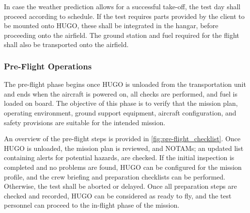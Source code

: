 In case the weather prediction allows for a successful take-off, the test day shall proceed according to schedule. If the test requires parts provided by the client to be mounted onto HUGO, these shall be integrated in the hangar, before proceeding onto the airfield. The ground station and fuel required for the flight shall also be transported onto the airfield.

\subsubsection{Pre-Flight Operations}
The pre-flight phase begins once HUGO is unloaded from the transportation unit and ends when the aircraft is powered on, all checks are performed, and fuel is loaded on board. The objective of this phase is to verify that the mission plan, operating environment, ground support equipment, aircraft configuration, and safety provisions are suitable for the intended mission.

An overview of the pre-flight steps is provided in \autoref{fig:pre-flight_checklist}. Once HUGO is unloaded, the mission plan is reviewed, and NOTAMs; an updated list containing alerts for potential hazards, are checked. If the initial inspection is completed and no problems are found, HUGO can be configured for the mission profile, and the crew briefing and preparation checklists can be performed. Otherwise, the test shall be aborted or delayed. Once all preparation steps are checked and recorded, HUGO can be considered as ready to fly, and the test personnel can proceed to the in-flight phase of the mission.


